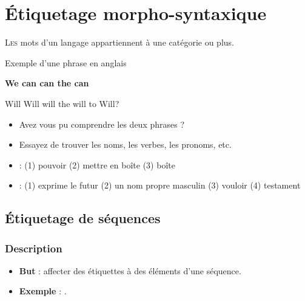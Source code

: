\documentclass{KodeBook}
\begin{document}
		\mainmatter
	
\fi
\chapter{Étiquetage morpho-syntaxique}

\begin{introduction}
	\lettrine{L}{es} mots d'un langage appartiennent à une catégorie ou plus. 
\end{introduction} 

\begin{exampleblock}{Exemple d'une phrase en anglais}
	\begin{center}
		\Huge\bfseries
		We can can the can
		
		Will Will will the will to Will?
	\end{center}
\end{exampleblock}

\begin{itemize}
	\item Avez vous pu comprendre  les deux phrases ?
	\item Essayez de trouver les noms, les verbes, les pronoms, etc.
	\item {} : (1) pouvoir (2) mettre en boîte (3) boîte
	\item {} : (1) exprime le futur (2) un nom propre masculin (3) vouloir (4) testament
\end{itemize}


\section{Étiquetage de séquences}

\subsection{Description}

\begin{itemize}
	\item \textbf{But} : affecter des étiquettes à des éléments d'une séquence. 
	\item \textbf{Exemple} : .
\end{itemize}
\end{document}
